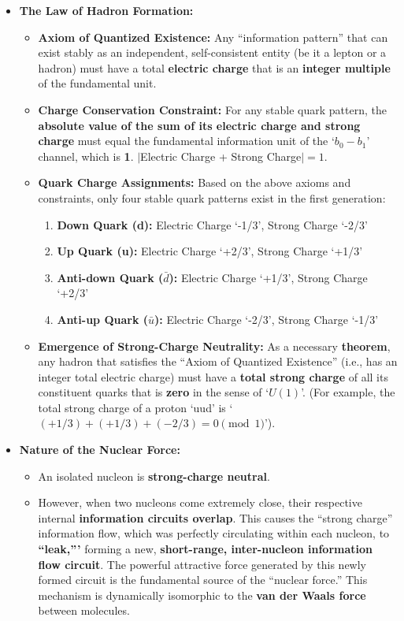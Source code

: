 \documentclass[11pt, a4paper]{article}
\begin{document}
\begin{itemize}
    \item \textbf{The Law of Hadron Formation:}
    \begin{itemize}
        \item \textbf{Axiom of Quantized Existence:} Any ``information pattern'' that can exist stably as an independent, self-consistent entity (be it a lepton or a hadron) must have a total \textbf{electric charge} that is an \textbf{integer multiple} of the fundamental unit.
        \item \textbf{Charge Conservation Constraint:} For any stable quark pattern, the \textbf{absolute value of the sum of its electric charge and strong charge} must equal the fundamental information unit of the `$b_0-b_1$' channel, which is \textbf{1}. $|$Electric Charge + Strong Charge$| = 1$.
        \item \textbf{Quark Charge Assignments:} Based on the above axioms and constraints, only four stable quark patterns exist in the first generation:
        \begin{enumerate}
            \item \textbf{Down Quark (d):} Electric Charge `-1/3', Strong Charge `-2/3'
            \item \textbf{Up Quark (u):} Electric Charge `+2/3', Strong Charge `+1/3'
            \item \textbf{Anti-down Quark ($\bar{d}$):} Electric Charge `+1/3', Strong Charge `+2/3'
            \item \textbf{Anti-up Quark ($\bar{u}$):} Electric Charge `-2/3', Strong Charge `-1/3'
        \end{enumerate}
        \item \textbf{Emergence of Strong-Charge Neutrality:} As a necessary \textbf{theorem}, any hadron that satisfies the ``Axiom of Quantized Existence'' (i.e., has an integer total electric charge) must have a \textbf{total strong charge} of all its constituent quarks that is \textbf{zero} in the sense of `$U(1)$'. (For example, the total strong charge of a proton `uud' is `$(+1/3) + (+1/3) + (-2/3) = 0 \pmod{1}$').
    \end{itemize}
    
    \item \textbf{Nature of the Nuclear Force:}
    \begin{itemize}
        \item An isolated nucleon is \textbf{strong-charge neutral}.
        \item However, when two nucleons come extremely close, their respective internal \textbf{information circuits overlap}. This causes the ``strong charge'' information flow, which was perfectly circulating within each nucleon, to \textbf{``leak,'''} forming a new, \textbf{short-range, inter-nucleon information flow circuit}. The powerful attractive force generated by this newly formed circuit is the fundamental source of the ``nuclear force.'' This mechanism is dynamically isomorphic to the \textbf{van der Waals force} between molecules.
    \end{itemize}
    

\end{itemize}
\end{document}
